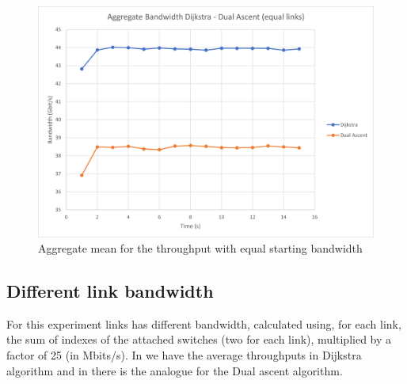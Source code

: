 \begin{figure}
	\centering
	\includegraphics[width=\textwidth]{img/aggregate-band-eq.png}
	\caption{Aggregate mean for the throughput with equal starting
	bandwidth}\label{fig:band-aggregate-eq}
\end{figure}

\subsection{Different link bandwidth}

For this experiment links has different bandwidth, calculated using, for each
link, the sum of indexes of the attached switches (two for each link),
multiplied by a factor of 25 (in Mbits/s). In 
we have the average throughputs in Dijkstra algorithm and in
 there is the analogue for the Dual ascent
algorithm.

